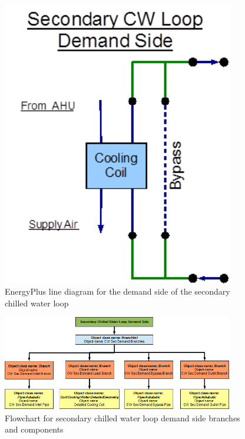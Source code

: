 \begin{figure}[hbtp] %
\centering
\includegraphics[width=0.9\textwidth, height=0.9\textheight, keepaspectratio=true]{media/image109.png}
\caption{EnergyPlus line diagram for the demand side of the secondary chilled water loop \protect \label{fig:energyplus-line-diagram-for-the-demand-side-007}}
\end{figure}

\begin{figure}[hbtp] %
\centering
\includegraphics[width=0.9\textwidth, height=0.9\textheight, keepaspectratio=true]{media/image110.png}
\caption{Flowchart for secondary chilled water loop demand side branches and components \protect \label{fig:flowchart-for-secondary-chilled-water-loop-demand-side-007}}
\end{figure}

